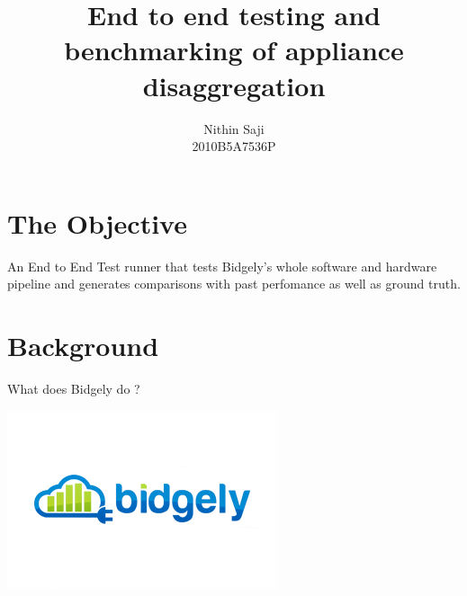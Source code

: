 \documentclass[xcolor=svgnames,handout]{beamer}
\title[End to end testing\hspace{2em}]{End to end testing and benchmarking of appliance disaggregation}
\author[Nithin Saji]{Nithin Saji\\{\small2010B5A7536P}}
\institute{BIDGELY}
\begin{document}
\maketitle


\section{The Objective}
\begin{frame}
An End to End Test runner that tests Bidgely's whole software and
hardware pipeline and generates comparisons with past perfomance as
well as ground truth.
\end{frame}

\section{Background}
\begin{frame}{What does Bidgely do ?}
  \begin{center}
    \includegraphics[scale=0.5]{Bidgely-How-Much-Energy-Do-You-Use}
  \end{center}
\end{frame}
\end{document}
